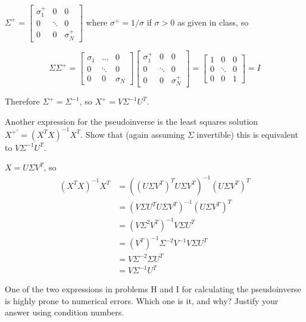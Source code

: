 \begin{solution}
	$\Sigma^+ = \begin{bmatrix} \sigma_1^+ & 0 & 0 \\ 0 & \ddots & 0 \\ 0 & 0 & \sigma_N^+ \end{bmatrix}$ where $\sigma^+ = 1 / \sigma$ if $\sigma > 0$ as given in class, so

	$$
	\Sigma \Sigma^+ =
	\begin{bmatrix}
		\sigma_1 & \dots & 0 \\
		0 & \ddots & 0 \\
		0 & 0 & \sigma_N
	\end{bmatrix}
	\begin{bmatrix}
		\sigma_1^+ & 0 & 0 \\
		0 & \ddots & 0 \\
		0 & 0 & \sigma_N^+
	\end{bmatrix} =
	\begin{bmatrix}
		1 & 0 & 0 \\
		0 & \ddots & 0 \\
		0 & 0 & 1
	\end{bmatrix} =
	I
	$$

	Therefore $\Sigma^+ = \Sigma^{-1}$, so $X^+ = V \Sigma^{-1} U^T$.
\end{solution}

\problem[4] Another expression for the pseudoinverse is the least squares solution $X^{+'} = (X^T X)^{-1}X^T$. Show that (again assuming $\Sigma$ invertible) this is equivalent to $V\Sigma^{-1}U^T$.
\begin{solution}
	$X = U \Sigma V^T$, so
	\begin{align*}
	(X^T X)^{-1} X^T &= \left( (U \Sigma V^T)^T U \Sigma V^T \right)^{-1} (U \Sigma V^T)^T \\
		&= \left( V \Sigma U^T U \Sigma V^T \right)^{-1} (U \Sigma V^T)^T \\
		&= \left( V \Sigma^2 V^T \right)^{-1} V \Sigma U^T \\
		&= (V^T)^{-1} \Sigma^{-2} V^{-1} V \Sigma U^T \\
		&= V \Sigma^{-2} \Sigma U^T \\
		&= V \Sigma^{-1} U^T
	\end{align*}
\end{solution}

\problem[2] One of the two expressions in problems H and I for calculating the pseudoinverse is highly prone to numerical errors. Which one is it, and why? Justify your answer using condition numbers.

